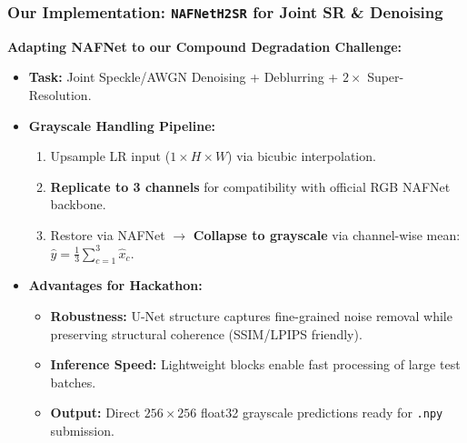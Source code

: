 \documentclass[aspectratio=169,xcolor=dvipsnames]{beamer}
\begin{document}
    \begin{frame}
        \frametitle{Our Implementation: \texttt{NAFNetH2SR} for Joint SR \& Denoising}
        \textbf{Adapting NAFNet to our Compound Degradation Challenge:}
        \begin{itemize}
            \item \textbf{Task:} Joint Speckle/AWGN Denoising + Deblurring + $2\times$ Super-Resolution.
            \item \textbf{Grayscale Handling Pipeline:} 
            \begin{enumerate}
                \item Upsample LR input ($1\times H\times W$) via bicubic interpolation.
                \item \textbf{Replicate to 3 channels} for compatibility with official RGB NAFNet backbone.
                \item Restore via NAFNet $\rightarrow$ \textbf{Collapse to grayscale} via channel-wise mean: $\hat{y} = \frac{1}{3}\sum_{c=1}^3 \hat{x}_c$.
            \end{enumerate}
            \item \textbf{Advantages for Hackathon:}
            \begin{itemize}
                \item \textbf{Robustness:} U-Net structure captures fine-grained noise removal while preserving structural coherence (SSIM/LPIPS friendly).
                \item \textbf{Inference Speed:} Lightweight blocks enable fast processing of large test batches.
                \item \textbf{Output:} Direct $256 \times 256$ float32 grayscale predictions ready for \texttt{.npy} submission.
            \end{itemize}
        \end{itemize}
    \end{frame}
\end{document}
